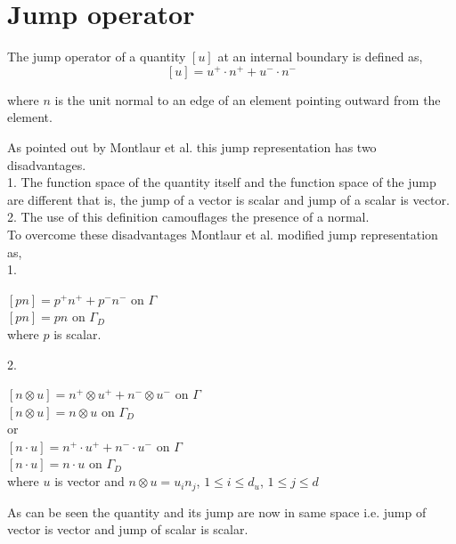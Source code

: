 \documentclass[a4paper,openany]{book}
\begin{document}
\section{Jump operator} \label{jump_operator_ch3}

The jump operator of a quantity $[u]$ at an internal boundary is defined as,
\begin{equation}\label{jump operator}
[u]=u^+ \cdot n^+ + u^- \cdot n^-
\end{equation}

where $n$ is the unit normal to an edge of an element pointing outward from the element.

As pointed out by Montlaur et al. \cite{Montlaur2} this jump representation has two disadvantages.\\

1. The function space of the quantity itself and the function space of the jump are different that is, the jump of a vector is scalar and jump of a scalar is vector.\\
2. The use of this definition camouflages the presence of a normal.\\

To overcome these disadvantages Montlaur et al. \cite{Montlaur2} modified jump representation as,\\

1.  
\begin{center}
$[pn] = p^+ n^+ + p^- n^- $ on $\Gamma$\\
$[pn] = p n $ on $\Gamma_D$\\
where $p$ is scalar.
\end{center}

2. \\
\begin{center}
$[n \otimes u] = n^+ \otimes u^+ + n^- \otimes u^-$ on $\Gamma$\\
$[n \otimes u] = n \otimes u$ on $\Gamma_D$\\
 or \\
$[n \cdot u] = n^+ \cdot u^+ + n^- \cdot u^-$ on $\Gamma$\\
$[n \cdot u] = n \cdot u$ on $\Gamma_D$\\
where $u$ is vector and $n \otimes u = u_i n_j$, $1 \leq i \leq d_u$, $1 \leq j \leq d$\\ 
\end{center}

As can be seen the quantity and its jump are now in same space i.e. jump of vector is vector and jump of scalar is scalar.
\end{document}
